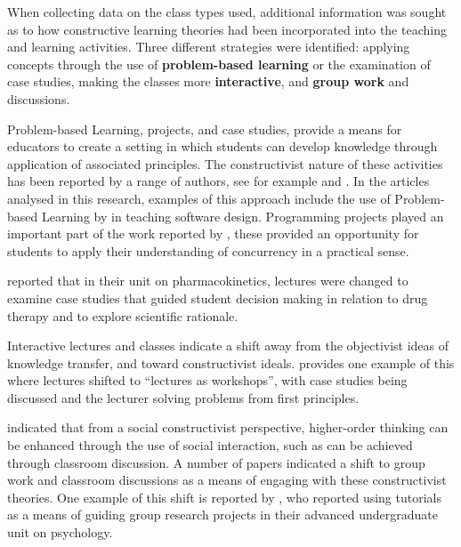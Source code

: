 When collecting data on the class types used, additional information was sought as to how constructive learning theories had been incorporated into the teaching and learning activities. Three different strategies were identified: applying concepts through the use of \textbf{problem-based learning} or the examination of case studies, making the classes more \textbf{interactive}, and \textbf{group work} and discussions. 

Problem-based Learning, projects, and case studies, provide a means for educators to create a setting in which students can develop knowledge through application of associated principles. The constructivist nature of these activities has been reported by a range of authors, see for example \citet{Hendry:1999,Savery:1995} and \citet{Schmidt:2009}. In the articles analysed in this research, examples of this approach include the use of Problem-based Learning by \citet{warren2005teaching} in teaching software design. Programming projects played an important part of the work reported by \citet{Brabrand:2008}, these provided an opportunity for students to apply their understanding of concurrency in a practical sense.

\citet{Davey:2002} reported that in their unit on pharmacokinetics, lectures were changed to examine case studies that guided student decision making in relation to drug therapy and to explore scientific rationale. 

Interactive lectures and classes indicate a shift away from the objectivist ideas of knowledge transfer, and toward constructivist ideals. \citet{shepherd2005weaving} provides one example of this where lectures shifted to ``lectures as workshops'', with case studies being discussed and the lecturer solving problems from first principles.

\citet{Palincsar:1998} indicated that from a social constructivist perspective, higher-order thinking can be enhanced through the use of social interaction, such as can be achieved through classroom discussion. A number of papers indicated a shift to group work and classroom discussions as a means of engaging with these constructivist theories. One example of this shift is reported by \citet{Israel:2007}, who reported using tutorials as a means of guiding group research projects in their advanced undergraduate unit on psychology.

